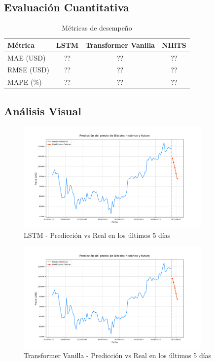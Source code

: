 \documentclass[12pt]{article}
\begin{document}
\bigskip
\subsection{Evaluación Cuantitativa}

\begin{table}[H]
\centering
\caption{Métricas de desempeño}
\begin{tabular}{lccc}
\toprule
\textbf{Métrica} & \textbf{LSTM} & \textbf{Transformer Vanilla} & \textbf{NHiTS} \\
\midrule
MAE (USD)  & ?? & ?? & ?? \\
RMSE (USD) & ?? & ?? & ?? \\
MAPE (\%)  & ?? & ?? & ?? \\
\bottomrule
\end{tabular}
\end{table}

\subsection{Análisis Visual}

\begin{figure}[H]
\centering
\includegraphics[width=0.85\textwidth]{../results/grafico_predicciones_futuras.png}
\caption{LSTM - Predicción vs Real en los últimos 5 días}
\end{figure}

\begin{figure}[H]
\centering
\includegraphics[width=0.85\textwidth]{../results/grafico_predicciones_futuras.png} %
\caption{Transformer Vanilla - Predicción vs Real en los últimos 5 días}
\end{figure}
\end{document}
